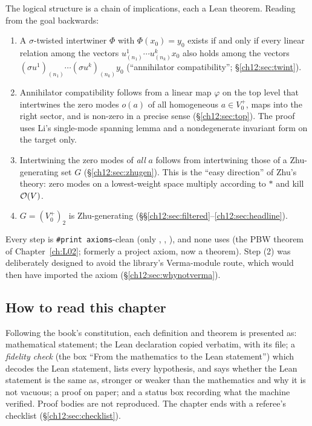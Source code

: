 The logical structure is a chain of implications, each a Lean theorem.  Reading from the goal
backwards:
\begin{enumerate}[label=(\arabic*)]
\item A $\sigma$-twisted intertwiner $\Phi$ with $\Phi(x_0)=y_0$ exists if and only if every linear
  relation among the vectors $u^1_{(n_1)}\cdots u^k_{(n_k)}x_0$ also holds among the vectors
  $(\sigma u^1)_{(n_1)}\cdots(\sigma u^k)_{(n_k)}y_0$ (``annihilator compatibility'';
  \S\ref{ch12:sec:twint}).
\item Annihilator compatibility follows from a linear map $\varphi$ on the top level that intertwines
  the zero modes $o(a)$ of all homogeneous $a\in V_0^+$, maps into the right sector, and is non-zero
  in a precise sense (\S\ref{ch12:sec:top}).  The proof uses Li's single-mode spanning lemma and a
  nondegenerate invariant form on the target only.
\item Intertwining the zero modes of \emph{all} $a$ follows from intertwining those of a
  Zhu-generating set $G$ (\S\ref{ch12:sec:zhugen}).  This is the ``easy direction'' of Zhu's theory:
  zero modes on a lowest-weight space multiply according to $\ast$ and kill $\mathcal{O}(V)$.
\item $G=(V_0^+)_2$ is Zhu-generating (\S\S\ref{ch12:sec:filtered}--\ref{ch12:sec:headline}).
\end{enumerate}
Every step is \texttt{\#print axioms}-clean (only , ,
), and none uses  (the PBW theorem of Chapter~\ref{ch:L02}; formerly a project axiom, now a theorem).  Step (2) was deliberately
designed to avoid the library's Verma-module route, which would then have imported the axiom 
(\S\ref{ch12:sec:whynotverma}).

\subsection*{How to read this chapter}

Following the book's constitution, each definition and theorem is presented as: mathematical
statement; the Lean declaration copied verbatim, with its file; a \emph{fidelity check} (the box
``From the mathematics to the Lean statement'') which decodes the Lean statement, lists every
hypothesis, and says whether the Lean statement is the same as, stronger or weaker than the
mathematics and why it is not vacuous; a proof on paper; and a status box recording what the machine
verified.  Proof bodies are not reproduced.  The chapter ends with a referee's checklist
(\S\ref{ch12:sec:checklist}).

